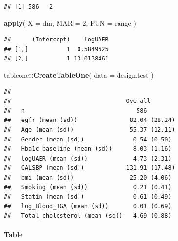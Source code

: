 \documentclass[]{article}
\newenvironment{Shaded}{\begin{snugshade}}{\end{snugshade}}
\newcommand{\DataTypeTok}[1]{\textcolor[rgb]{0.13,0.29,0.53}{#1}}
\newcommand{\DecValTok}[1]{\textcolor[rgb]{0.00,0.00,0.81}{#1}}
\newcommand{\KeywordTok}[1]{\textcolor[rgb]{0.13,0.29,0.53}{\textbf{#1}}}
\newcommand{\NormalTok}[1]{#1}
\newcommand{\OperatorTok}[1]{\textcolor[rgb]{0.81,0.36,0.00}{\textbf{#1}}}
\let\oldparagraph\paragraph
\renewcommand{\paragraph}[1]{\oldparagraph{#1}\mbox{}}
\begin{document}
\begin{verbatim}
## [1] 586   2
\end{verbatim}

\begin{Shaded}
\begin{Highlighting}[]
\KeywordTok{apply}\NormalTok{( }\DataTypeTok{X =}\NormalTok{ dm, }\DataTypeTok{MAR =} \DecValTok{2}\NormalTok{, }\DataTypeTok{FUN =}\NormalTok{ range )}
\end{Highlighting}
\end{Shaded}

\begin{verbatim}
##      (Intercept)    logUAER
## [1,]           1  0.5849625
## [2,]           1 13.0138461
\end{verbatim}

\begin{Shaded}
\begin{Highlighting}[]
\NormalTok{tableone}\OperatorTok{::}\KeywordTok{CreateTableOne}\NormalTok{( }\DataTypeTok{data =}\NormalTok{ design.test )}
\end{Highlighting}
\end{Shaded}

\begin{verbatim}
##                                
##                                 Overall       
##   n                                586        
##   egfr (mean (sd))               82.04 (28.24)
##   Age (mean (sd))                55.37 (12.11)
##   Gender (mean (sd))              0.54 (0.50) 
##   Hba1c_baseline (mean (sd))      8.03 (1.16) 
##   logUAER (mean (sd))             4.73 (2.31) 
##   CALSBP (mean (sd))            131.91 (17.48)
##   bmi (mean (sd))                25.20 (4.06) 
##   Smoking (mean (sd))             0.21 (0.41) 
##   Statin (mean (sd))              0.61 (0.49) 
##   log_Blood_TGA (mean (sd))       0.01 (0.69) 
##   Total_cholesterol (mean (sd))   4.69 (0.88)
\end{verbatim}

\newpage

\hypertarget{table-4}{%
\paragraph{Table}\label{table-4}}
\end{document}
